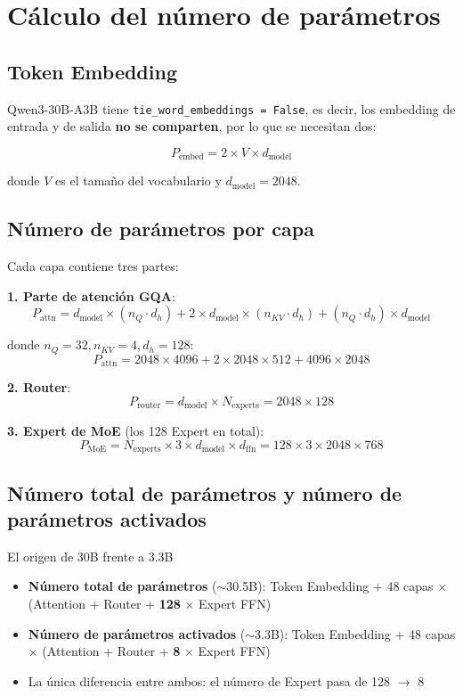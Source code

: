 \section{Cálculo del número de parámetros}

\subsection{Token Embedding}

Qwen3-30B-A3B tiene \texttt{tie\_word\_embeddings = False}, es decir, los embedding de entrada y de salida \textbf{no se comparten}, por lo que se necesitan dos:

$$
P_{\text{embed}} = 2 \times V \times d_{\text{model}}
$$

donde $V$ es el tamaño del vocabulario y $d_{\text{model}} = 2048$.

\subsection{Número de parámetros por capa}

Cada capa contiene tres partes:

\textbf{1. Parte de atención GQA}:
$$
P_{\text{attn}} = d_{\text{model}} \times (n_Q \cdot d_h) + 2 \times d_{\text{model}} \times (n_{KV} \cdot d_h) + (n_Q \cdot d_h) \times d_{\text{model}}
$$

donde $n_Q = 32, n_{KV} = 4, d_h = 128$:
$$
P_{\text{attn}} = 2048 \times 4096 + 2 \times 2048 \times 512 + 4096 \times 2048
$$

\textbf{2. Router}:
$$
P_{\text{router}} = d_{\text{model}} \times N_{\text{experts}} = 2048 \times 128
$$

\textbf{3. Expert de MoE} (los 128 Expert en total):
$$
P_{\text{MoE}} = N_{\text{experts}} \times 3 \times d_{\text{model}} \times d_{\text{ffn}} = 128 \times 3 \times 2048 \times 768
$$

\subsection{Número total de parámetros y número de parámetros activados}

\begin{importantbox}{El origen de 30B frente a 3.3B}
\begin{itemize}
  \item \textbf{Número total de parámetros} ($\sim$30.5B): Token Embedding + 48 capas $\times$ (Attention + Router + \textbf{128} $\times$ Expert FFN)
  \item \textbf{Número de parámetros activados} ($\sim$3.3B): Token Embedding + 48 capas $\times$ (Attention + Router + \textbf{8} $\times$ Expert FFN)
  \item La única diferencia entre ambos: el número de Expert pasa de 128 $\to$ 8
\end{itemize}
\end{importantbox}

